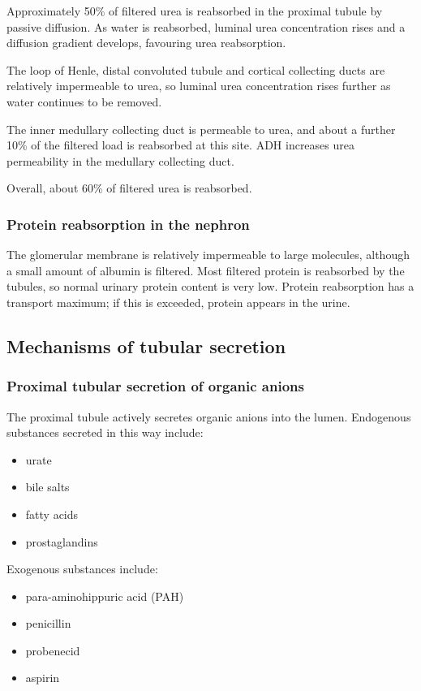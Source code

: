 \documentclass[11pt,a4paper]{article}
\begin{document}
Approximately 50\% of filtered urea is reabsorbed in the proximal tubule by passive diffusion. As water is reabsorbed, luminal urea concentration rises and a diffusion gradient develops, favouring urea reabsorption.

The loop of Henle, distal convoluted tubule and cortical collecting ducts are relatively impermeable to urea, so luminal urea concentration rises further as water continues to be removed.

The inner medullary collecting duct is permeable to urea, and about a further 10\% of the filtered load is reabsorbed at this site. ADH increases urea permeability in the medullary collecting duct.

Overall, about 60\% of filtered urea is reabsorbed.

\subsubsection{Protein reabsorption in the nephron}

The glomerular membrane is relatively impermeable to large molecules, although a small amount of albumin is filtered. Most filtered protein is reabsorbed by the tubules, so normal urinary protein content is very low. Protein reabsorption has a transport maximum; if this is exceeded, protein appears in the urine.

\subsection{Mechanisms of tubular secretion}

\subsubsection{Proximal tubular secretion of organic anions}

The proximal tubule actively secretes organic anions into the lumen. Endogenous substances secreted in this way include:
\begin{itemize}
    \item urate
    \item bile salts
    \item fatty acids
    \item prostaglandins
\end{itemize}

Exogenous substances include:
\begin{itemize}
    \item para-aminohippuric acid (PAH)
    \item penicillin
    \item probenecid
    \item aspirin
\end{itemize}
\end{document}
